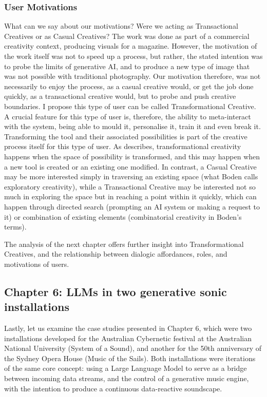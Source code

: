 \subsubsection{User Motivations}

What can we say about our motivations? Were we acting as Transactional Creatives or as Casual Creatives? The work was done as part of a commercial creativity context, producing visuals for a magazine. However, the motivation of the work itself was not to speed up a process, but rather, the stated intention was to probe the limits of generative AI, and to produce a new type of image that was not possible with traditional photography. Our motivation therefore, was not necessarily to enjoy the process, as a casual creative would, or get the job done quickly, as a transactional creative would, but to probe and push creative boundaries. I propose this type of user can be called Transformational Creative.  A crucial feature for this type of user is, therefore, the ability to meta-interact with the system, being able to mould it, personalise it, train it and even break it. Transforming the tool and their associated possibilities is part of the creative process itself for this type of user. As \citet{Boden2003-hk} describes, transformational creativity happens when the space of possibility is transformed, and this may happen when a new tool is created or an existing one modified. In contrast, a Casual Creative may be more interested simply in traversing an existing space (what Boden calls exploratory creativity), while a Transactional Creative may be interested not so much in exploring the space but in reaching a point within it quickly, which can happen through directed search (prompting an AI system or making a request to it) or combination of existing elements (combinatorial creativity in Boden's terms). 

The analysis of the next chapter offers further insight into Transformational Creatives, and the relationship between dialogic affordances, roles, and motivations of users. 

\subsection{Chapter 6: LLMs in two generative sonic installations}

Lastly, let us examine the case studies presented in Chapter 6, which were two installations developed for the Australian Cybernetic festival at the Australian National University (System of a Sound), and another for the 50th anniversary of the Sydney Opera House (Music of the Sails). Both installations were iterations of the same core concept: using a Large Language Model to serve as a bridge between incoming data streams, and the control of a generative music engine, with the intention to produce a continuous data-reactive soundscape. 

